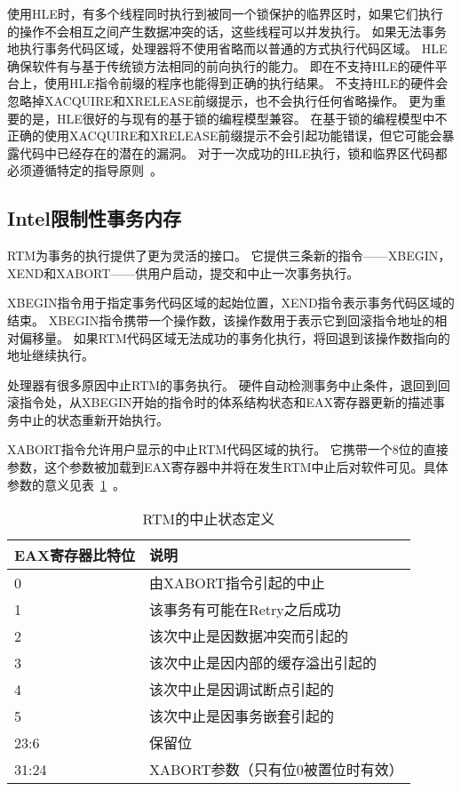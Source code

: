 使用HLE时，有多个线程同时执行到被同一个锁保护的临界区时，如果它们执行的操作不会相互之间产生数据冲突的话，这些线程可以并发执行。
如果无法事务地执行事务代码区域，处理器将不使用省略而以普通的方式执行代码区域。
HLE确保软件有与基于传统锁方法相同的前向执行的能力。
即在不支持HLE的硬件平台上，使用HLE指令前缀的程序也能得到正确的执行结果。
不支持HLE的硬件会忽略掉XACQUIRE和XRELEASE前缀提示，也不会执行任何省略操作。
更为重要的是，HLE很好的与现有的基于锁的编程模型兼容。
在基于锁的编程模型中不正确的使用XACQUIRE和XRELEASE前缀提示不会引起功能错误，但它可能会暴露代码中已经存在的潜在的漏洞。
对于一次成功的HLE执行，锁和临界区代码都必须遵循特定的指导原则~\cite{Intel2015Intel}。

\subsection{Intel限制性事务内存}
RTM为事务的执行提供了更为灵活的接口。
它提供三条新的指令——XBEGIN， XEND和XABORT——供用户启动，提交和中止一次事务执行。

XBEGIN指令用于指定事务代码区域的起始位置，XEND指令表示事务代码区域的结束。
XBEGIN指令携带一个操作数，该操作数用于表示它到回滚指令地址的相对偏移量。
如果RTM代码区域无法成功的事务化执行，将回退到该操作数指向的地址继续执行。

处理器有很多原因中止RTM的事务执行。
硬件自动检测事务中止条件，退回到回滚指令处，从XBEGIN开始的指令时的体系结构状态和EAX寄存器更新的描述事务中止的状态重新开始执行。

XABORT指令允许用户显示的中止RTM代码区域的执行。
它携带一个8位的直接参数，这个参数被加载到EAX寄存器中并将在发生RTM中止后对软件可见。具体参数的意义见表~\ref{tab:rtm_status}~。

\begin{table}[htbp]
  \centering
  \caption{RTM的中止状态定义}
  \label{tab:rtm_status}
  \begin{tabular}{ll}
    \toprule
       EAX寄存器比特位 & 说明 \\
    \midrule
      0     & 由XABORT指令引起的中止 \\
      1     & 该事务有可能在Retry之后成功\\
      2     & 该次中止是因数据冲突而引起的 \\
      3     & 该次中止是因内部的缓存溢出引起的\\
      4     & 该次中止是因调试断点引起的 \\
      5     & 该次中止是因事务嵌套引起的 \\
      23:6  & 保留位\\
      31:24 & XABORT参数（只有位0被置位时有效） \\
    \bottomrule
  \end{tabular}
\end{table}

